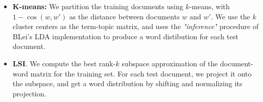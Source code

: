 \begin{itemize}
\item
{\bf K-means:} We partition the training documents using $k$-means, with $1-\cos(w,w')$ as the distance between documents $w$ and $w'$.
We use the $k$ cluster centers as the term-topic matrix, and uses the {\em "inference"} procedure of BLei's LDA implementation to produce a word
distibution for each test document. 

\item {\bf LSI}.  We compute the best rank-$k$ subspace approximation of the document-word
matrix for the training set. For each test document, we project it onto the subspace, and get a word distribution by shifting and normalizing its projection. 

\end{itemize}



